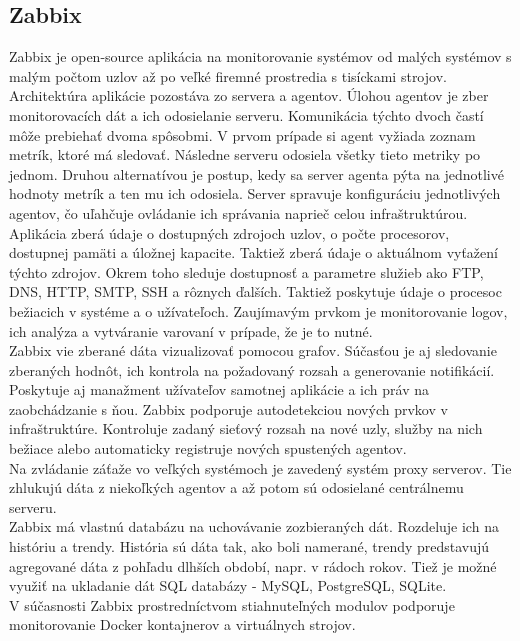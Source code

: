 \documentclass[printed,11pt,twoside,color,cover,table]{fithesis3}
\begin{document}
\subsection{Zabbix}
Zabbix je open-source aplikácia na monitorovanie systémov od malých systémov s malým počtom uzlov až po veľké firemné prostredia s tisíckami strojov. Architektúra aplikácie pozostáva zo servera a agentov.
Úlohou agentov je zber monitorovacích dát a ich odosielanie serveru. Komunikácia týchto dvoch častí môže prebiehať dvoma spôsobmi. V prvom prípade si agent vyžiada zoznam metrík, ktoré má sledovať. Následne 
serveru odosiela všetky tieto metriky po jednom. Druhou alternatívou je postup, kedy sa server agenta pýta na jednotlivé hodnoty metrík a ten mu ich odosiela. Server spravuje konfiguráciu jednotlivých agentov,
čo uľahčuje ovládanie ich správania naprieč celou infraštruktúrou.
\\Aplikácia zberá údaje o dostupných zdrojoch uzlov, o počte procesorov, dostupnej pamäti a úložnej kapacite. Taktiež zberá údaje o aktuálnom vyťažení týchto zdrojov. Okrem toho sleduje dostupnosť a parametre
služieb ako FTP, DNS, HTTP, SMTP, SSH a rôznych ďalších. Taktiež poskytuje údaje o procesoc bežiacich v systéme a o užívateľoch. Zaujímavým prvkom je monitorovanie logov, ich analýza a vytváranie varovaní 
v prípade, že je to nutné.
\\Zabbix vie zberané dáta vizualizovať pomocou grafov. Súčasťou je aj sledovanie zberaných hodnôt, ich kontrola na požadovaný rozsah a generovanie notifikácií. Poskytuje aj manažment užívateľov samotnej 
aplikácie a ich práv na zaobchádzanie s ňou. Zabbix podporuje autodetekciou nových prvkov v infraštruktúre. Kontroluje zadaný sieťový rozsah na nové uzly, služby na nich bežiace alebo automaticky registruje
nových spustených agentov.
\\Na zvládanie záťaže vo veľkých systémoch je zavedený systém proxy serverov. Tie zhlukujú dáta z niekoľkých agentov a až potom sú odosielané centrálnemu serveru.
\\Zabbix má vlastnú databázu na uchovávanie zozbieraných dát. Rozdeluje ich na históriu a trendy. História sú dáta tak, ako boli namerané, trendy predstavujú agregované dáta z pohľadu dlhších období, napr. v 
rádoch rokov. Tiež je možné využiť na ukladanie dát SQL databázy - MySQL, PostgreSQL, SQLite.
\\V súčasnosti Zabbix prostredníctvom stiahnuteľných modulov podporuje monitorovanie Docker kontajnerov a virtuálnych strojov.
\end{document}
